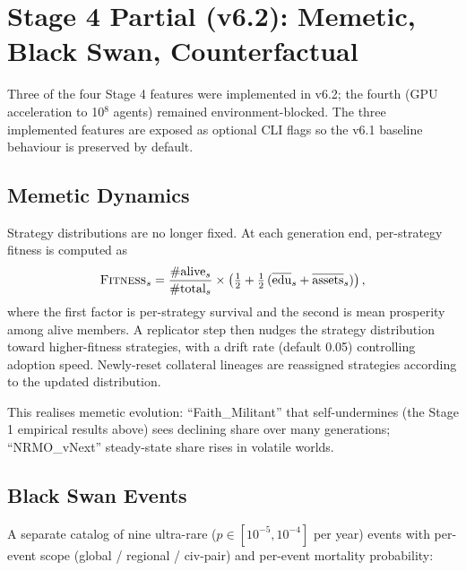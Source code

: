 \section{Stage 4 Partial (v6.2): Memetic, Black Swan, Counterfactual}
\label{sec:stage4-v62}

Three of the four Stage 4 features were implemented in v6.2; the
fourth (GPU acceleration to 10$^8$ agents) remained
environment-blocked. The three implemented features are exposed as
optional CLI flags so the v6.1 baseline behaviour is preserved by
default.

\subsection{Memetic Dynamics}
\label{subsec:memetic}

Strategy distributions are no longer fixed. At each generation
end, per-strategy fitness is computed as
\begin{equation}
\textsc{Fitness}_s
= \frac{\#\text{alive}_s}{\#\text{total}_s}
\times \left(\tfrac{1}{2} +
\tfrac{1}{2}\,(\overline{\text{edu}}_s + \overline{\text{assets}}_s)\right),
\end{equation}
where the first factor is per-strategy survival and the second is
mean prosperity among alive members. A replicator step then nudges
the strategy distribution toward higher-fitness strategies, with a
drift rate (default 0.05) controlling adoption speed. Newly-reset
collateral lineages are reassigned strategies according to the
updated distribution.

This realises memetic evolution: ``Faith\_Militant'' that
self-undermines (the Stage 1 empirical results above) sees declining
share over many generations; ``NRMO\_vNext'' steady-state share
rises in volatile worlds.

\subsection{Black Swan Events}
\label{subsec:black-swan}

A separate catalog of nine ultra-rare ($p \in [10^{-5}, 10^{-4}]$
per year) events with per-event scope (global / regional /
civ-pair) and per-event mortality probability:

